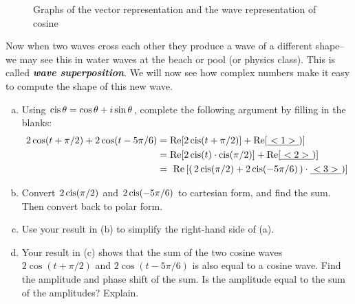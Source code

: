 \begin{figure}[htb]
	  \caption{\label{fig:complex:3} Graphs of the vector representation and the wave representation of cosine }
\end{figure}

Now when two waves cross each other they produce a wave of a different shape--we may see this in water waves at the beach or pool (or physics class). This is called {\bf \emph{wave superposition}}. We will now see how complex numbers make it easy to compute the shape of this new wave.

\begin{exercise}{45}
\begin{enumerate}[(a)]
\item
Using $\operatorname{cis} \theta = \cos \theta + i\sin \theta$, complete the following argument by filling in the blanks:
\begin{align*} 
2 \cos(t + \pi/2) + 2 \cos(t - 5\pi/6) &= \text{Re}[2 \operatorname{cis} (t + \pi/2)] + \text{Re}[\underline{~<1>~})]\\
&= \text{Re}[2 \operatorname{cis} (t) \cdot \operatorname{cis}(\pi/2)] + \textrm{Re}[\underline{~<2>~})]\\
&= \text{ Re} \left[\left(\, 2 \operatorname{cis}(\pi/2) + 2 \operatorname{cis}(-5\pi/6) \, \right) \cdot \underline{~<3>~}) \right] 
\end{align*}
\item
Convert $2 \operatorname{cis}(\pi/2)$ and $2 \operatorname{cis}(-5\pi/6)$ to cartesian form, and find the sum. Then convert back to polar form.
\item
Use your result in (b) to simplify the right-hand side of (a).
\item
Your result in (c) shows that the sum of the two cosine waves  $2\cos(t + \pi/2)$ and $2 \cos(t - 5\pi/6)$ is also equal to a cosine wave.  Find the amplitude and phase shift of the sum. Is the amplitude equal to the sum of the amplitudes? Explain.
\end{enumerate}
\end{exercise}

